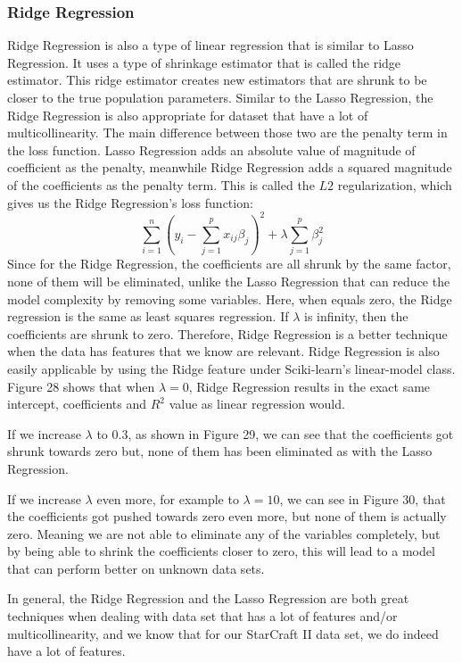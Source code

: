 \documentclass[a4paper,12pt]{report}
\begin{document}
\subsubsection{Ridge Regression}
Ridge Regression is also a type of linear regression that is similar to Lasso Regression. It uses a type of shrinkage estimator that is called the ridge estimator. This ridge estimator creates new estimators that are shrunk to be closer to the true population parameters. Similar to the Lasso Regression, the Ridge Regression is also appropriate for dataset that have a lot of multicollinearity. The main difference between those two are the penalty term in the loss function. Lasso Regression adds an absolute value of magnitude of coefficient as the penalty, meanwhile Ridge Regression adds a squared magnitude of the coefficients as the penalty term. This is called the $L2$ regularization, which gives us the Ridge Regression’s loss function:
$$\sum_{i=1}^n\left(y_i-\sum_{j=1}^px_{ij}\beta_j\right)^2+\lambda\sum_{j=1}^p\beta_j^2$$
Since for the Ridge Regression, the coefficients are all shrunk by the same factor, none of them will be eliminated, unlike the Lasso Regression that can reduce the model complexity by removing some variables. Here, when  equals zero, the Ridge regression is the same as least squares regression. If $\lambda$ is infinity, then the coefficients are shrunk to zero. Therefore, Ridge Regression is a better technique when the data has features that we know are relevant. Ridge Regression is also easily applicable by using the Ridge feature under Sciki-learn’s linear-model class. Figure 28 shows that when $\lambda=0$, Ridge Regression results in the exact same intercept, coefficients and $R^2$ value as linear regression would.

If we increase $\lambda$ to 0.3, as shown in Figure 29, we can see that the coefficients got shrunk towards zero but, none of them has been eliminated as with the Lasso Regression. 

If we increase $\lambda$ even more, for example to $\lambda=10$, we can see in Figure 30, that the coefficients got pushed towards zero even more, but none of them is actually zero. Meaning we are not able to eliminate any of the variables completely, but by being able to shrink the coefficients closer to zero, this will lead to a model that can perform better on unknown data sets. 

In general, the Ridge Regression and the Lasso Regression are both great techniques when dealing with data set that has a lot of features and/or multicollinearity, and we know that for our StarCraft II data set, we do indeed have a lot of features.
\end{document}
